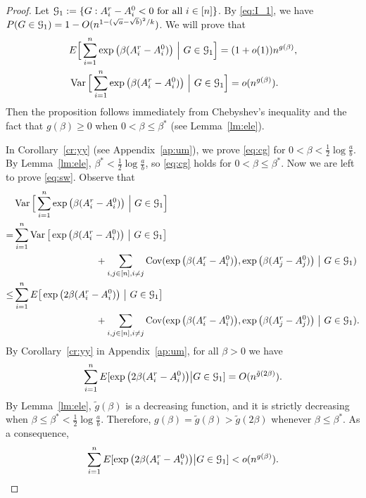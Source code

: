 \documentclass{article}
\begin{document}
\begin{proof}
Let $\mathcal{G}_1:=\{G:A^r_i-A^0_i<0\text{~for all~}i\in[n] \}$.
By \eqref{eq:I_1}, we have $P(G\in\mathcal{G}_1)=1-O(n^{1-(\sqrt{a}-\sqrt{b})^2/k})$. We will prove that
\begin{align}
& E \Big[ \sum_{i=1}^n  \exp\big(\beta (A^r_i-A^0_i) \big) ~\Big|~ G\in\mathcal{G}_1 \Big]
= (1+o(1)) n^{g(\beta)}  , \label{eq:cg} \\
& \operatorname{Var} \Big[ \sum_{i=1}^n  \exp\big(\beta (A^r_i-A^0_i) \big) ~\Big|~ G\in\mathcal{G}_1 \Big]
= o (n^{g(\beta)} ) .  \label{eq:sw}
\end{align}
Then the proposition follows immediately from  Chebyshev's inequality and the fact that $g(\beta)\ge 0$ when $0<\beta\le\beta^\ast$ (see Lemma~\ref{lm:ele}).


In Corollary~\ref{cr:yy} (see Appendix~\ref{ap:um}), we prove \eqref{eq:cg} for $0<\beta<\frac{1}{2}\log\frac{a}{b}$. By Lemma~\ref{lm:ele}, $\beta^\ast<\frac{1}{2}\log\frac{a}{b}$, so \eqref{eq:cg} holds for $0< \beta\le \beta^\ast$.
Now we are left to prove \eqref{eq:sw}. Observe that
\begin{equation} \label{eq:mh1}
\begin{aligned}
& \operatorname{Var} \Big[ \sum_{i=1}^n  \exp\big(\beta (A^r_i-A^0_i) \big) ~\Big|~ G\in\mathcal{G}_1 \Big] \\
= & \sum_{i=1}^n  \operatorname{Var} \big[\exp\big(\beta (A^r_i-A^0_i) \big) ~\big|~ G\in\mathcal{G}_1 \big] \\
& \hspace*{1.2in} + \sum_{i,j\in[n],i\neq j}
\operatorname{Cov}(\exp\big(\beta (A^r_i-A^0_i) \big), \exp\big(\beta (A^r_j-A^0_j) \big) ~\big|~ G\in\mathcal{G}_1 ) \\
\le & \sum_{i=1}^n E \big[ \exp\big(2\beta (A^r_i-A^0_i) \big) ~\big|~ G\in\mathcal{G}_1 \big] \\
& \hspace*{1.2in} + \sum_{i,j\in[n],i\neq j}
\operatorname{Cov}(\exp\big(\beta (A^r_i-A^0_i) \big), \exp\big(\beta (A^r_j-A^0_j) \big) ~\big|~ G\in\mathcal{G}_1) .
\end{aligned}
\end{equation}
By Corollary~\ref{cr:yy} in Appendix~\ref{ap:um}, for all $\beta>0$ we have
$$
\sum_{i=1}^n E[ \exp\big(2\beta (A^r_i-A^0_i) \big) \big| G\in\mathcal{G}_1]
= O ( n^{\tilde{g}(2\beta)} ) .
$$
By Lemma~\ref{lm:ele}, $\tilde{g}(\beta)$ is a decreasing function, and it is strictly decreasing when $\beta\le\beta^\ast<\frac{1}{2}\log\frac{a}{b}$. Therefore, $g(\beta)=\tilde{g}(\beta)>\tilde{g}(2\beta)$ whenever $\beta\le\beta^\ast$. As a consequence, 
\begin{equation} \label{eq:mh2}
\sum_{i=1}^n E[ \exp\big(2\beta (A^r_i-A^0_i) \big) \big| G\in\mathcal{G}_1]
< o ( n^{g(\beta)} ) .
\end{equation}




\end{proof}
\end{document}
